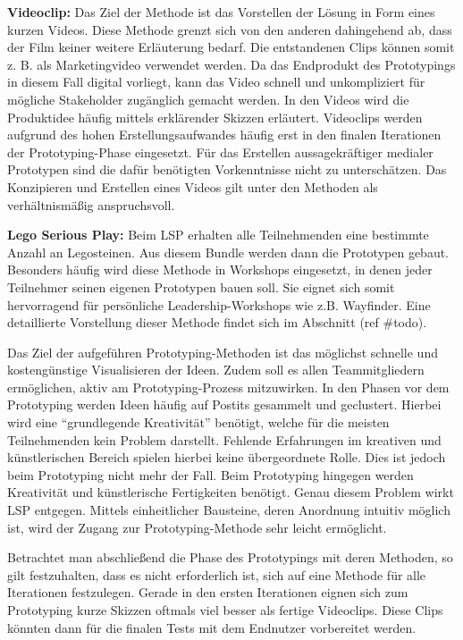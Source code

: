 \textbf{Videoclip:} Das Ziel der Methode ist das Vorstellen der Lösung in Form eines kurzen Videos. Diese Methode grenzt sich von den anderen dahingehend ab, dass der Film keiner weitere Erläuterung bedarf. Die entstandenen Clips können somit z. B. als Marketingvideo verwendet werden. Da das Endprodukt des Prototypings in diesem Fall digital vorliegt, kann das Video schnell und unkompliziert für mögliche Stakeholder zugänglich gemacht werden. In den Videos wird die Produktidee häufig mittels erklärender Skizzen erläutert. Videoclips werden aufgrund des hohen Erstellungsaufwandes häufig erst in den finalen Iterationen der Prototyping-Phase eingesetzt. Für das Erstellen aussagekräftiger medialer Prototypen sind die dafür benötigten Vorkenntnisse nicht zu unterschätzen. Das Konzipieren und Erstellen eines Videos gilt unter den Methoden als verhältnismäßig anspruchsvoll. 

\textbf{Lego Serious Play: } Beim LSP erhalten alle Teilnehmenden eine bestimmte Anzahl an Legosteinen. Aus diesem Bundle werden dann die Prototypen gebaut. Besonders häufig wird diese Methode in Workshops eingesetzt, in denen jeder Teilnehmer seinen eigenen Prototypen bauen soll. Sie eignet sich somit hervorragend für persönliche Leadership-Workshops wie z.B. Wayfinder. Eine detaillierte Vorstellung dieser Methode findet sich im Abschnitt (ref \#todo). \newline

Das Ziel der aufgeführen Prototyping-Methoden ist das möglichst schnelle und kostengünstige Visualisieren der Ideen. Zudem soll es allen Teammitgliedern ermöglichen, aktiv am Prototyping-Prozess mitzuwirken. In den Phasen vor dem Prototyping werden Ideen häufig auf Postits gesammelt und geclustert. Hierbei wird eine ``grundlegende Kreativität'' benötigt, welche für die meisten Teilnehmenden kein Problem darstellt. Fehlende Erfahrungen im kreativen und künstlerischen Bereich spielen hierbei keine übergeordnete Rolle. Dies ist jedoch beim Prototyping nicht mehr der Fall. Beim Prototyping hingegen werden Kreativität und künstlerische Fertigkeiten benötigt. Genau diesem Problem wirkt LSP entgegen. Mittels einheitlicher Bausteine, deren Anordnung intuitiv möglich ist, wird der Zugang zur Prototyping-Methode sehr leicht ermöglicht.

Betrachtet man abschließend die Phase des Prototypings mit deren Methoden, so gilt festzuhalten, dass es nicht erforderlich ist, sich auf eine Methode für alle Iterationen festzulegen. Gerade in den ersten Iterationen eignen sich zum Prototyping kurze Skizzen oftmals viel besser als fertige Videoclips. Diese Clips könnten dann für die finalen Tests mit dem Endnutzer vorbereitet werden.


